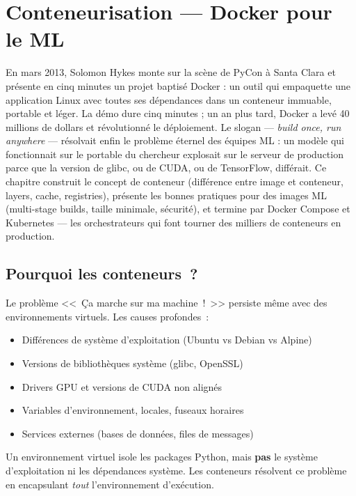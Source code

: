 \chapter{Conteneurisation --- Docker pour le ML}
\label{ch:docker}

En mars 2013, Solomon Hykes monte sur la scène de PyCon à Santa Clara et présente en cinq minutes un projet baptisé Docker : un outil qui empaquette une application Linux avec toutes ses dépendances dans un conteneur immuable, portable et léger. La démo dure cinq minutes ; un an plus tard, Docker a levé 40 millions de dollars et révolutionné le déploiement. Le slogan --- \emph{build once, run anywhere} --- résolvait enfin le problème éternel des équipes ML : un modèle qui fonctionnait sur le portable du chercheur explosait sur le serveur de production parce que la version de glibc, ou de CUDA, ou de TensorFlow, différait. Ce chapitre construit le concept de conteneur (différence entre image et conteneur, layers, cache, registries), présente les bonnes pratiques pour des images ML (multi-stage builds, taille minimale, sécurité), et termine par Docker Compose et Kubernetes --- les orchestrateurs qui font tourner des milliers de conteneurs en production.

\section{Pourquoi les conteneurs~?}
\label{sec:why-containers}

Le probl\`eme <<~\c{C}a marche sur ma machine~!~>> persiste m\^eme avec des
environnements virtuels. Les causes profondes~:
\begin{itemize}
  \item Diff\'erences de syst\`eme d'exploitation (Ubuntu vs Debian vs Alpine)
  \item Versions de biblioth\`eques syst\`eme (glibc, OpenSSL)
  \item Drivers GPU et versions de CUDA non align\'es
  \item Variables d'environnement, locales, fuseaux horaires
  \item Services externes (bases de donn\'ees, files de messages)
\end{itemize}

Un environnement virtuel isole les packages Python, mais \textbf{pas} le
syst\`eme d'exploitation ni les d\'ependances syst\`eme. Les conteneurs
r\'esolvent ce probl\`eme en encapsulant \emph{tout} l'environnement
d'ex\'ecution.

